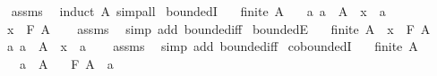 \begin{isabellebody}
%
\isadelimproof
\ \ %
\endisadelimproof
%
\isatagproof
{}\isamarkupfalse%
\ assms\ \isamarkupfalse%
\ {\isacharparenleft}{\kern0pt}induct\ A{\isacharparenright}{\kern0pt}\ simp{\isacharunderscore}{\kern0pt}all%
\endisatagproof
{\isafoldproof}%
%
\isadelimproof
\isanewline
%
\endisadelimproof
\isanewline
{}\isamarkupfalse%
\ boundedI{\isacharcolon}{\kern0pt}\isanewline
\ \ \ {\isachardoublequoteopen}finite\ A{\isachardoublequoteclose}\isanewline
\ \ \ {\isachardoublequoteopen}{\isasymAnd}a{\isachardot}{\kern0pt}\ a\ {\isasymin}\ A\ {\isasymLongrightarrow}\ x\ \isactrlbold {\isasymle}\ a{\isachardoublequoteclose}\isanewline
\ \ \ {\isachardoublequoteopen}x\ \isactrlbold {\isasymle}\ F\ A{\isachardoublequoteclose}\isanewline
%
\isadelimproof
\ \ %
\endisadelimproof
%
\isatagproof
{}\isamarkupfalse%
\ assms\ \isamarkupfalse%
\ {\isacharparenleft}{\kern0pt}simp\ add{\isacharcolon}{\kern0pt}\ bounded{\isacharunderscore}{\kern0pt}iff{\isacharparenright}{\kern0pt}%
\endisatagproof
{\isafoldproof}%
%
\isadelimproof
\isanewline
%
\endisadelimproof
\isanewline
{}\isamarkupfalse%
\ boundedE{\isacharcolon}{\kern0pt}\isanewline
\ \ \ {\isachardoublequoteopen}finite\ A{\isachardoublequoteclose}\ \ {\isachardoublequoteopen}x\ \isactrlbold {\isasymle}\ F\ A{\isachardoublequoteclose}\isanewline
\ \ \ {\isachardoublequoteopen}{\isasymAnd}a{\isachardot}{\kern0pt}\ a\ {\isasymin}\ A\ {\isasymLongrightarrow}\ x\ \isactrlbold {\isasymle}\ a{\isachardoublequoteclose}\isanewline
%
\isadelimproof
\ \ %
\endisadelimproof
%
\isatagproof
{}\isamarkupfalse%
\ assms\ \isamarkupfalse%
\ {\isacharparenleft}{\kern0pt}simp\ add{\isacharcolon}{\kern0pt}\ bounded{\isacharunderscore}{\kern0pt}iff{\isacharparenright}{\kern0pt}%
\endisatagproof
{\isafoldproof}%
%
\isadelimproof
\isanewline
%
\endisadelimproof
\isanewline
{}\isamarkupfalse%
\ coboundedI{\isacharcolon}{\kern0pt}\isanewline
\ \ \ {\isachardoublequoteopen}finite\ A{\isachardoublequoteclose}\isanewline
\ \ \ \ \ {\isachardoublequoteopen}a\ {\isasymin}\ A{\isachardoublequoteclose}\isanewline
\ \ \ {\isachardoublequoteopen}F\ A\ \isactrlbold {\isasymle}\ a{\isachardoublequoteclose}\isanewline
%
\isadelimproof
%
\endisadelimproof
%
\isatagproof
{}\isamarkupfalse%
\ {\isacharminus}{\kern0pt}\isanewline
\ \ \isamarkupfalse%

\end{isabellebody}
